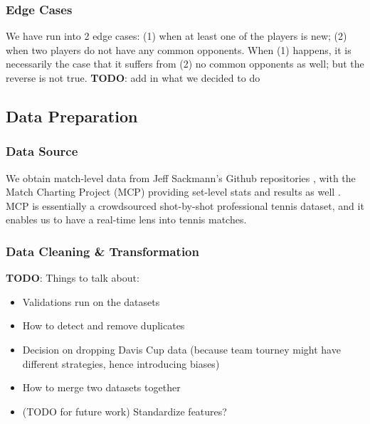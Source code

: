 \documentclass[paper=a4, fontsize=11pt]{scrartcl} %
\numberwithin{equation}{section} %
\numberwithin{figure}{section} %
\numberwithin{table}{section} %
\begin{document}
\subsubsection{Edge Cases}
We have run into 2 edge cases: (1) when at least one of the players is new; (2) when two players do not have any common opponents. When (1) happens, it is necessarily the case that it suffers from (2) no common opponents as well; but the reverse is not true. \textbf{TODO}: add in what we decided to do
\subsection{Data Preparation}
\subsubsection{Data Source}
We obtain match-level data from Jeff Sackmann's Github repositories \cite{tennis_atp} \cite{tennis_charting}, with the Match Charting Project (MCP) providing set-level stats and results as well \cite{tennis_charting}. MCP is essentially a crowdsourced shot-by-shot professional tennis dataset, and it enables us to have a real-time lens into tennis matches. 
\subsubsection{Data Cleaning \& Transformation}
\textbf{TODO}: Things to talk about:
\begin{itemize}
\item Validations run on the datasets
\item How to detect and remove duplicates
\item Decision on dropping Davis Cup data (because team tourney might have different strategies, hence introducing biases)
\item How to merge two datasets together
\item (TODO for future work) Standardize features? 
\end{itemize}
\end{document}
